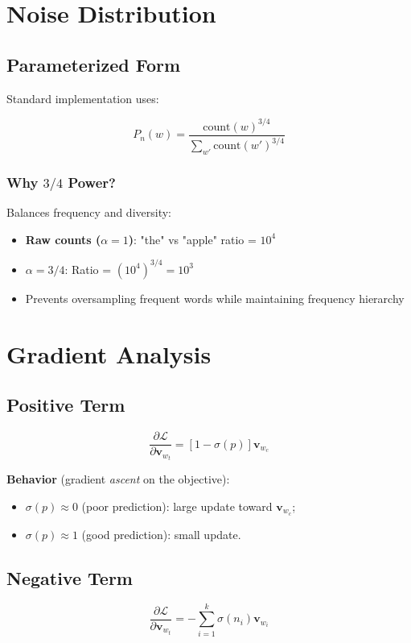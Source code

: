 \begin{notechapter}
\section{Noise Distribution}
\subsection{Parameterized Form}
Standard implementation uses:

\[
P_n(w) = \frac{\text{count}(w)^{3/4}}{\sum_{w'} 
\text{count}(w')^{3/4}}
\]

\subsubsection{Why \( 3/4 \) Power?}
Balances frequency and diversity:
\begin{itemize}
    \item \textbf{Raw counts (\( \alpha=1 \))}: "the" vs "apple" 
    ratio = \( 10^4 \)
    \item \( \alpha=3/4 \): Ratio = \( (10^4)^{3/4} = 10^3 \)
    \item Prevents oversampling frequent words while maintaining 
    frequency hierarchy
\end{itemize}

\section{Gradient Analysis}
\subsection{Positive Term}
\[
\frac{\partial \mathcal{L}}{\partial \mathbf{v}_{w_t}} 
= [1 - \sigma(p)] \mathbf{v}_{w_c}
\]

\textbf{Behavior} (gradient \emph{ascent} on the objective):
\begin{itemize}
\item \( \sigma(p) \approx 0 \) (poor prediction): large update
toward \( \mathbf{v}_{w_c} \);
\item \( \sigma(p) \approx 1 \) (good prediction): small update.
\end{itemize}

\subsection{Negative Term}
\[
\frac{\partial \mathcal{L}}{\partial \mathbf{v}_{w_t}} 
= -\sum_{i=1}^k \sigma(n_i) \mathbf{v}_{w_i}
\]


\end{notechapter}
